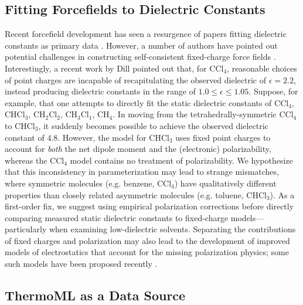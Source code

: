 \documentclass[aps,pre,twocolumn,nofootinbib,superscriptaddress,linenumbers]{revtex4-1}
\begin{document}

\subsection{Fitting Forcefields to Dielectric Constants}

Recent forcefield development has seen a resurgence of papers fitting dielectric constants as primary data \cite{wang2014building, fennell2014fixed}.  
However, a number of authors have pointed out potential challenges in constructing self-consistent fixed-charge force fields \cite{fennell2012simple, leontyev2014polarizable}.  
Interestingly, a recent work by Dill \cite{fennell2012simple} pointed out that, for $\mathrm{CCl_4}$, reasonable choices of point charges are incapable of recapitulating the observed dielectric of $\epsilon = 2.2$, instead producing dielectric constants in the range of $1.0 \le \epsilon \le 1.05$.  
Suppose, for example, that one attempts to directly fit the static dielectric constants of $\mathrm{CCl_4}$, $\mathrm{CHCl_3}$, $\mathrm{CH_2Cl_2}$, $\mathrm{CH_3Cl_1}$, $\mathrm{CH_4}$.  
In moving from the tetrahedrally-symmetric $\mathrm{CCl_4}$ to $\mathrm{CHCl_3}$, it suddenly becomes possible to achieve the observed dielectric constant of 4.8.  
However, the model for $\mathrm{CHCl_3}$ uses fixed point charges to account for \emph{both} the net dipole moment and the (electronic) polarizability, whereas the $\mathrm{CCl_4}$ model contains no treatment of polarizability.  
We hypothesize that this inconsistency in parameterization may lead to strange mismatches, where symmetric molecules (e.g. benzene, $\mathrm{CCl_4}$) have qualitatively different properties than closely related asymmetric molecules (e.g. toluene, $\mathrm{CHCl_3}$).  
As a first-order fix, we suggest using empirical polarization corrections before directly comparing measured static dielectric constants to fixed-charge models---particularly when examining low-dielectric solvents.  
Separating the contributions of fixed charges and polarization may also lead to the development of improved models of electrostatics that account for the missing polarization physics; some such models have been proposed recently \cite{leontyev2014polarizable}.


\subsection{ThermoML as a Data Source}
\end{document}
